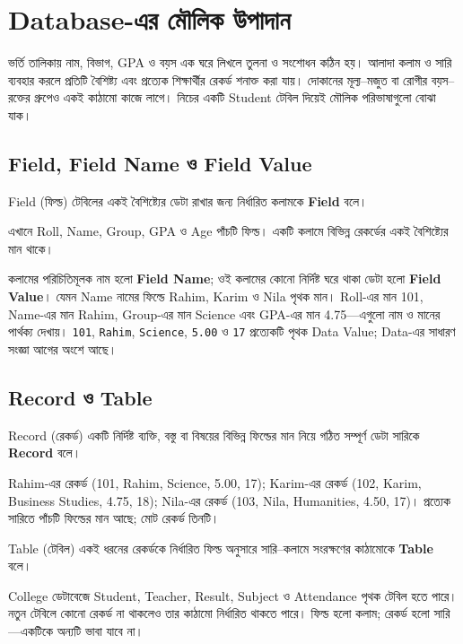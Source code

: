 \section{Database-এর মৌলিক উপাদান}
ভর্তি তালিকায় নাম, বিভাগ, GPA ও বয়স এক ঘরে লিখলে তুলনা ও সংশোধন কঠিন হয়। আলাদা কলাম ও সারি ব্যবহার করলে প্রতিটি বৈশিষ্ট্য এবং প্রত্যেক শিক্ষার্থীর রেকর্ড শনাক্ত করা যায়। দোকানের মূল্য–মজুত বা রোগীর বয়স–রক্তের গ্রুপেও একই কাঠামো কাজে লাগে। নিচের একটি Student টেবিল দিয়েই মৌলিক পরিভাষাগুলো বোঝা যাক।



\subsection{Field, Field Name ও Field Value}
\begin{definitionbox}{Field (ফিল্ড)}
টেবিলের একই বৈশিষ্ট্যের ডেটা রাখার জন্য নির্ধারিত কলামকে \textbf{Field} বলে।
\end{definitionbox}
এখানে Roll, Name, Group, GPA ও Age পাঁচটি ফিল্ড। একটি কলামে বিভিন্ন রেকর্ডের একই বৈশিষ্ট্যের মান থাকে।

কলামের পরিচিতিমূলক নাম হলো \textbf{Field Name}; ওই কলামের কোনো নির্দিষ্ট ঘরে থাকা ডেটা হলো \textbf{Field Value}। যেমন Name নামের ফিল্ডে Rahim, Karim ও Nila পৃথক মান। Roll-এর মান 101, Name-এর মান Rahim, Group-এর মান Science এবং GPA-এর মান 4.75—এগুলো নাম ও মানের পার্থক্য দেখায়। \texttt{101}, \texttt{Rahim}, \texttt{Science}, \texttt{5.00} ও \texttt{17} প্রত্যেকটি পৃথক Data Value; Data-এর সাধারণ সংজ্ঞা আগের অংশে আছে।

\subsection{Record ও Table}
\begin{definitionbox}{Record (রেকর্ড)}
একটি নির্দিষ্ট ব্যক্তি, বস্তু বা বিষয়ের বিভিন্ন ফিল্ডের মান নিয়ে গঠিত সম্পূর্ণ ডেটা সারিকে \textbf{Record} বলে।
\end{definitionbox}
Rahim-এর রেকর্ড (101, Rahim, Science, 5.00, 17); Karim-এর রেকর্ড (102, Karim, Business Studies, 4.75, 18); Nila-এর রেকর্ড (103, Nila, Humanities, 4.50, 17)। প্রত্যেক সারিতে পাঁচটি ফিল্ডের মান আছে; মোট রেকর্ড তিনটি।

\begin{definitionbox}{Table (টেবিল)}
একই ধরনের রেকর্ডকে নির্ধারিত ফিল্ড অনুসারে সারি–কলামে সংরক্ষণের কাঠামোকে \textbf{Table} বলে।
\end{definitionbox}
College ডেটাবেজে Student, Teacher, Result, Subject ও Attendance পৃথক টেবিল হতে পারে। নতুন টেবিলে কোনো রেকর্ড না থাকলেও তার কাঠামো নির্ধারিত থাকতে পারে। ফিল্ড হলো কলাম; রেকর্ড হলো সারি—একটিকে অন্যটি ভাবা যাবে না।


